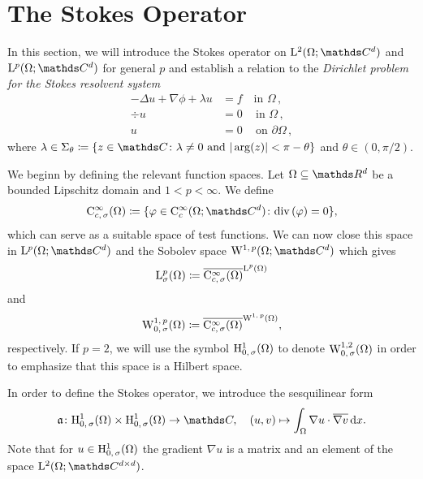 \section{The Stokes Operator}
\label{sec:stokesOperator}

In this section, we will introduce the Stokes operator on $\Ell^2(\Omega; \C^d)$ and $\Ell^p(\Omega; \C^d)$ for general $p$ and establish a relation to the \emph{Dirichlet problem for the Stokes resolvent system}
\begin{align}
  -\Delta u + \nabla \phi + \lambda u &= f  \quad\text{in } \Omega\,, \nonumber\\
  \div u &= 0                               \,\quad\text{in } \Omega\,, \label{eq:stokesResolventSystem} \\
  u &= 0 \,\quad\text{on } \partial\Omega\,, \nonumber
\end{align}
where $\lambda \in \Sigma_\theta \coloneqq \{ z \in \C \colon \lambda \neq 0 \text{ and } |\arg(z) | < \pi - \theta \}$ and $\theta \in (0, \pi/2)$.

We beginn by defining the relevant function spaces.
Let $\Omega \subseteq \R^d$ be a bounded Lipschitz domain and $1 < p < \infty$. 
We define
\begin{align*}
  \CC_{c,\, \sigma}^\infty(\Omega) \coloneqq \{ \varphi \in \CC_c^\infty(\Omega; \C^d) \colon \div(\varphi) = 0 \},
\end{align*}
which can serve as a suitable space of test functions.
We can now close this space in $\Ell^p(\Omega; \C^d)$ and the Sobolev space $\WW^{1,\,p}(\Omega; \C^d)$ which gives
\begin{align*}
  \mathrm{L}_\sigma^p(\Omega) \coloneqq \overline{\mathrm{C}_{c,\,\sigma}^\infty(\Omega)}^{\mathrm{L}^p(\Omega)}
\end{align*}
and
\begin{align*}
  \mathrm{W}_{0,\,\sigma}^{1,\,p}(\Omega) \coloneqq \overline{\mathrm{C}_{c,\,\sigma}^\infty(\Omega)}^{\mathrm{W}^{1,\,p}(\Omega)},
\end{align*}
respectively.
If $p = 2$, we will use the symbol $\mathrm{H}_{0,\,\sigma}^1(\Omega)$ to denote $\mathrm{W}_{0,\,\sigma}^{1,2}(\Omega)$ in order to emphasize that this space is a Hilbert space.

In order to define the Stokes operator, we introduce the sesquilinear form
\begin{align*}
  \aform \colon \HH_{0,\,\sigma}^1(\Omega) \times \HH_{0,\,\sigma}^1(\Omega) \to \C, \quad (u,v) \mapsto \int_\Omega \nabla u \cdot \overline{\nabla v} \d x.
\end{align*}
Note that for $u \in \mathrm{H}_{0,\,\sigma}^1(\Omega)$ the gradient $\nabla u$ is a matrix and an element of the space $\Ell^2(\Omega; \C^{d \times d})$.

